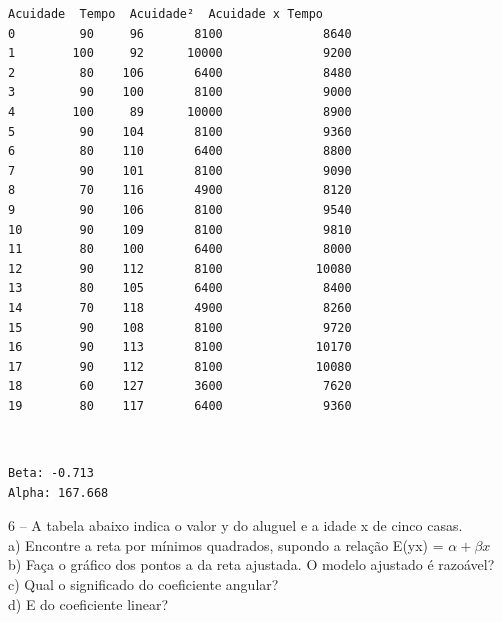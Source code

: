 \documentclass[11pt]{article}
\begin{document}
    
    \begin{Verbatim}[commandchars=\\\{\}]
    Acuidade  Tempo  Acuidade²  Acuidade x Tempo
0         90     96       8100              8640
1        100     92      10000              9200
2         80    106       6400              8480
3         90    100       8100              9000
4        100     89      10000              8900
5         90    104       8100              9360
6         80    110       6400              8800
7         90    101       8100              9090
8         70    116       4900              8120
9         90    106       8100              9540
10        90    109       8100              9810
11        80    100       6400              8000
12        90    112       8100             10080
13        80    105       6400              8400
14        70    118       4900              8260
15        90    108       8100              9720
16        90    113       8100             10170
17        90    112       8100             10080
18        60    127       3600              7620
19        80    117       6400              9360
    \end{Verbatim}

    
    \begin{center}
    \end{center}
    { \hspace*{\fill} \\}
    
    \begin{Verbatim}[commandchars=\\\{\}]
Beta: -0.713
Alpha: 167.668
    \end{Verbatim}

    6 -- A tabela abaixo indica o valor y do aluguel e a idade x de cinco
casas.\\
a) Encontre a reta por mínimos quadrados, supondo a relação
E(y\textbar x) = \(\alpha + \beta x\)\\
b) Faça o gráfico dos pontos a da reta ajustada. O modelo ajustado é
razoável?\\
c) Qual o significado do coeficiente angular?\\
d) E do coeficiente linear?
\end{document}
